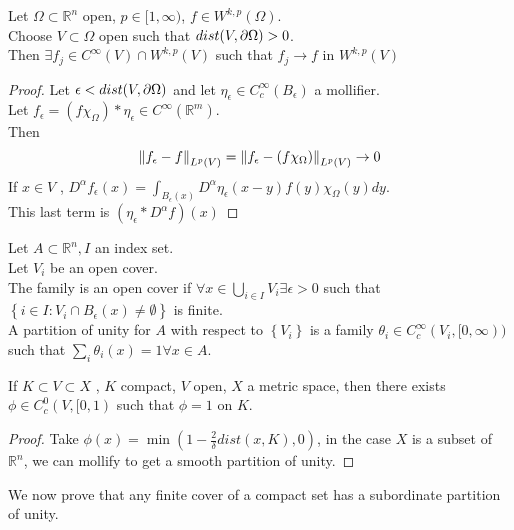 \documentclass[../main.tex]{subfiles}
\begin{document}
\begin{lemma}
Let $\Omega \subset \mathbb{R}^n$ open, $p \in [ 1, \infty ) $, $f \in W^{k,p}( \Omega) $.\\
Choose $V \subset \Omega$ open such that $dist( V, \partial\Omega) > 0$.\\
Then $\exists f_j \in C^{ \infty }( V) \cap W^{k,p}( V) $ such that $f_j \to f$ in $W^{k,p}( V) $ 
\end{lemma}
\begin{proof}
Let $\epsilon < dist( V,\partial \Omega) $ and let $\eta_{\epsilon} \in C^{ \infty }_c( B_\epsilon) $ a mollifier.\\
Let $f_\epsilon = ( f\chi_{\Omega} ) \ast \eta_{\epsilon} \in C^{ \infty }( \mathbb{R}^m) $.\\
Then 
\[ 
\left\lVert f_\epsilon - f\right\rVert_{L^{p}( V) } = \left\lVert f_\epsilon - ( f\chi_{\Omega} )\right\rVert_{L^{p}( V) } \to 0
\]
If $x\in V$ , $D^{\alpha}f_{\epsilon} ( x) = \int_{ B_{\epsilon} ( x)  }^{  } D^{\alpha}\eta_\epsilon( x-y ) f( y) \chi_{\Omega} ( y) dy$.\\
This last term is $( \eta_\epsilon \ast D^{\alpha}f) ( x) $ 
\end{proof}
\begin{defn}
	Let $A \subset \mathbb{R}^n, I$ an index set.\\
	Let $V_i$ be an open cover.\\
	The family is an open cover if $\forall x \in \bigcup_{i \in I} V_i\exists \epsilon>0$ such that $ \left\{ i \in I : V_i \cap B_\epsilon( x) \neq \emptyset \right\} $ is finite.\\
	A partition of unity for $A$ with respect to $ \left\{ V_i \right\} $ is a family $\theta_i \in C^{ \infty }_c( V_i, [ 0, \infty ) ) $ such that $\sum_i \theta_i( x) =1\forall x \in A$.
\end{defn}
\begin{lemma}
If $K \subset V \subset X$ , $K$ compact, $V$ open, $X$ a metric space, then there exists $\phi \in C^{0}_c( V,[0,1) $ such that $\phi=1$ on $K$.
\end{lemma}
\begin{proof}
Take $\phi( x) = \min( 1- \frac{2}{\delta}dist( x,K) ,0 ) $, in the case $X $ is a subset of $ \mathbb{R}^n$, we can mollify to get a smooth partition of unity.
\end{proof}
We now prove that any finite cover of a compact set has a subordinate partition of unity.
\end{document}
